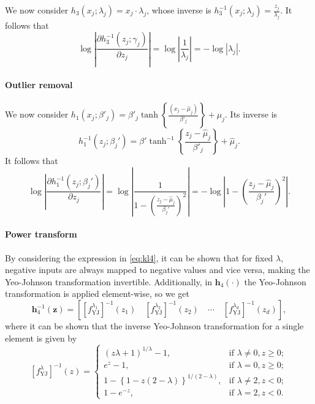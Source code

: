 \documentclass{statsmsc}
\begin{document}
We now consider $h_3(x_j;\lambda_j)=x_j\cdot \lambda_j$, whose inverse is $h_3^{-1}(x_j;\lambda_j)=\frac{z_j}{\lambda_j}$. It follows that
\begin{equation}
    \log \left|\frac{\partial h_3^{-1}(z_j ; \gamma_j)}{\partial z_j} \right|
    = \log \left|\frac{1}{\lambda_j}  \right|
    =- \log |\lambda_j|.
\end{equation}

\paragraph{Outlier removal}%
\label{par:Outlier removal}

We now consider $h_1(x_j;\beta'_j)= \beta'_j \tanh\left\{\frac{(x_j - \hat{\mu}_j)}{\beta'_j}  \right\} + \hat{\mu}_j$. Its inverse is
\begin{equation}
    h_1^{-1}(z_j;\beta_j') =\beta' \tanh^{-1} \left\{\frac{z_j - \hat{\mu}_j}{\beta'_j}  \right\}
    +\hat{\mu}_j.
\end{equation}
It follows that
\begin{equation}
    \log \left|\frac{\partial h_1^{-1}(z_j ; \beta_j')}{\partial z_j} \right|
    = \log \left| \frac{1}{1-\left( \frac{z_j-\hat{\mu}_j}{\beta_j'}  \right)^2}  \right|
    = -\log\left| 1-\left( \frac{z_j-\hat{\mu}_j}{\beta_j'}  \right)^2 \right|.
\end{equation}

\paragraph{Power transform}%
\label{par:Power transform}

By considering the expression in \cref{eq:kl4}, it can be shown that for fixed $\lambda$, negative inputs are always
mapped to negative values and vice versa, making the Yeo-Johnson transformation invertible.
Additionally, in $\mathbf{h}_4(\cdot)$ the Yeo-Johnson transformation is applied element-wise, so
we get
\begin{equation}
    \mathbf{h}_4^{-1}(\mathbf{z})=\left[\left[f_{\textrm{YJ}}^{\lambda_1}\right]^{-1}(z_1) \quad \left[f_{\textrm{YJ}}^{\lambda_2}\right]^{-1}(z_2) \quad \cdots \quad \left[f_{\textrm{YJ}}^{\lambda_d}\right]^{-1}(z_d) \right],
\end{equation}
where it can be shown that the inverse Yeo-Johnson transformation for a single element is given by
\begin{equation}
    \left[f_{\textrm{YJ}}^\lambda\right]^{-1}(z)= \left\{
    \begin{array}{ll}
        (z \lambda + 1)^{1/\lambda} -1, & \textrm{if } \lambda \neq 0, z \geq 0; \\
        e^z-1, & \textrm{if } \lambda = 0, z \geq 0;  \\
        1-\left\{1-z(2-\lambda)\right\}^{1/ (2-\lambda)} , & \textrm{if } \lambda \neq 2, z < 0; \\
        1-e^{-z}, & \textrm{if } \lambda=2, z < 0.
    \end{array}
    \right.
\end{equation}
\end{document}
